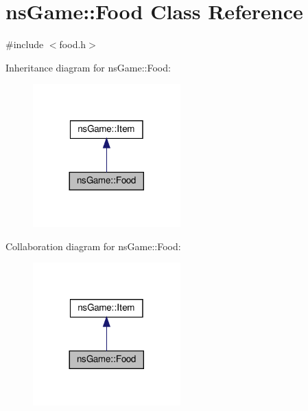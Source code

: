 \hypertarget{classns_game_1_1_food}{}\section{ns\+Game\+:\+:Food Class Reference}
\label{classns_game_1_1_food}


{\ttfamily \#include $<$food.\+h$>$}



Inheritance diagram for ns\+Game\+:\+:Food\+:
\nopagebreak
\begin{figure}[H]
\begin{center}
\leavevmode
\includegraphics[width=161pt]{classns_game_1_1_food__inherit__graph}
\end{center}
\end{figure}


Collaboration diagram for ns\+Game\+:\+:Food\+:
\nopagebreak
\begin{figure}[H]
\begin{center}
\leavevmode
\includegraphics[width=161pt]{classns_game_1_1_food__coll__graph}
\end{center}
\end{figure}
